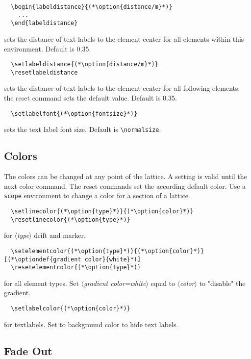 \documentclass[a4paper]{scrartcl}
\newcommand{\option}[1]{{\color{blue}$\langle$\textit{#1}$\rangle$}}
\newcommand{\optiondef}[2]{{\color{green!50!black}$\langle$\textit{#1=#2}$\rangle$}}
\begin{document}
\begin{lstlisting}
  \begin{labeldistance}{(*\option{distance/m}*)}
    ...
  \end{labeldistance}
\end{lstlisting}
sets the distance of text labels to the element center for all elements within this
environment. Default is 0.35.

\begin{lstlisting}
  \setlabeldistance{(*\option{distance/m}*)}
  \resetlabeldistance
\end{lstlisting}
sets the distance of text labels to the element center for all following elements. the
reset command sets the default value. Default is 0.35.

\begin{lstlisting}
  \setlabelfont{(*\option{fontsize}*)}
\end{lstlisting}
sets the text label font size. Default is \lstinline+\normalsize+.



\subsection{Colors}
\label{sec:colors}
The colors can be changed at any point of the lattice. A setting is valid until the next
color command. The reset commands set the according default color. Use a \lstinline+scope+
environment to change a color for a section of a lattice.

\begin{lstlisting}
  \setlinecolor{(*\option{type}*)}{(*\option{color}*)}
  \resetlinecolor{(*\option{type}*)}
\end{lstlisting}
for \option{type} drift and marker.

\begin{lstlisting}
  \setelementcolor{(*\option{type}*)}{(*\option{color}*)}[(*\optiondef{gradient color}{white}*)]
  \resetelementcolor{(*\option{type}*)}
\end{lstlisting}
for all element types. Set \optiondef{gradient color}{white} equal to \option{color} to
"disable" the gradient.

\begin{lstlisting}
  \setlabelcolor{(*\option{color}*)}
\end{lstlisting}
for textlabels. Set to background color to hide text labels.



\subsection{Fade Out}
\label{sec:fade-out}
\end{document}
